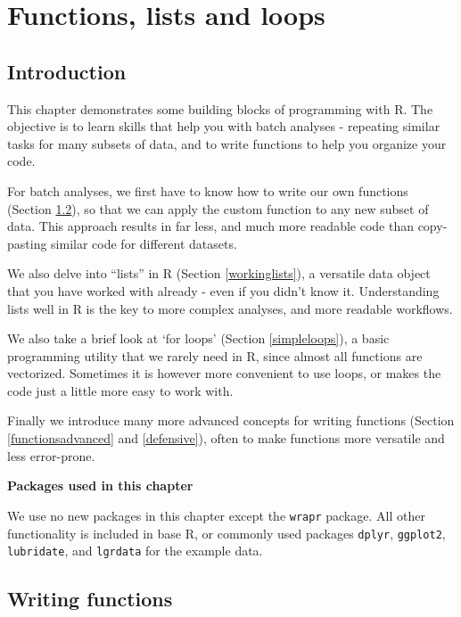 \documentclass[]{book}
\begin{document}
\hypertarget{programming}{%
\chapter{Functions, lists and loops}\label{programming}}

\hypertarget{introduction-1}{%
\section{Introduction}\label{introduction-1}}

This chapter demonstrates some building blocks of programming with R. The objective is to learn skills that help you with batch analyses - repeating similar tasks for many subsets of data, and to write functions to help you organize your code.

For batch analyses, we first have to know how to write our own functions (Section \ref{writefunctions}), so that we can apply the custom function to any new subset of data. This approach results in far less, and much more readable code than copy-pasting similar code for different datasets.

We also delve into ``lists'' in R (Section \ref{workinglists}), a versatile data object that you have worked with already - even if you didn't know it. Understanding lists well in R is the key to more complex analyses, and more readable workflows.

We also take a brief look at `for loops' (Section \ref{simpleloops}), a basic programming utility that we rarely need in R, since almost all functions are vectorized. Sometimes it is however more convenient to use loops, or makes the code just a little more easy to work with.

Finally we introduce many more advanced concepts for writing functions (Section \ref{functionsadvanced} and \ref{defensive}), often to make functions more versatile and less error-prone.

\textbf{Packages used in this chapter}

We use no new packages in this chapter except the \texttt{wrapr} package. All other functionality is included in base R, or commonly used packages \texttt{dplyr}, \texttt{ggplot2}, \texttt{lubridate}, and \texttt{lgrdata} for the example data.

\hypertarget{writefunctions}{%
\section{Writing functions}\label{writefunctions}}
\end{document}
